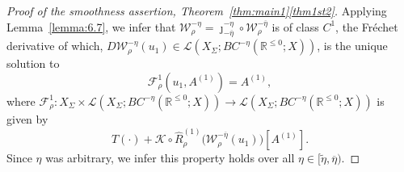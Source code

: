 \documentclass[a4paper, 12pt, oneside, reqno, notitlepage]{amsart}
\theoremstyle{plain}
\theoremstyle{definition}
\theoremstyle{remark}
\begin{document}
\begin{proof}[Proof of the smoothness assertion, Theorem~\ref{thm:main1}\ref{thm1st2}]
Applying Lemma~\ref{lemma:6.7}, we infer that $\mathcal{W}_\rho^{-{\eta}} = \jmath_{-\overline{\eta}}^{-\eta} \circ \mathcal{W}_\rho^{-\overline{\eta}} $ is of class $C^1$, the Fréchet  derivative of which,
$D\mathcal{W}_\rho^{-{\eta}}(u_1) \in \mathcal{L}(X_\Sigma; BC^{-\eta}(\mathbb{R}^{\leq 0};X))$,
is the unique solution to
\begin{displaymath}
     \mathcal{F}_\rho^1(u_1,A^{(1)} ) = A^{(1)} ,
\end{displaymath}
where $\mathcal{F}_\rho^1 : X_\Sigma \times \mathcal{L}(X_\Sigma; BC^{-\eta}(\mathbb{R}^{\leq 0};X)) \to \mathcal{L}(X_\Sigma; BC^{-\eta}(\mathbb{R}^{\leq 0};X))$ is given by
\begin{equation}
    T(\cdot) + \mathcal{K} \circ \widehat{R}_\rho^{(1)} \big(\mathcal{W}_\rho^{-\overline{\eta}}(u_1) \big) [A^{(1)}] .
    \label{eq:F1}
\end{equation}
Since $\eta $ was arbitrary, we infer this property holds over all $ \eta \in [\tilde{\eta},\overline{\eta})$.




\end{proof}
\end{document}
